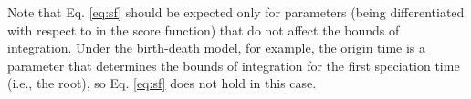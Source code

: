 \documentclass[oneside]{article}
\begin{document}
Note that Eq. \ref{eq:sf} should be expected only for parameters
(being differentiated with respect to in the score function) that
do not affect the bounds of integration.
Under the birth-death model, for example, the origin time is a parameter
that determines the bounds of integration for the first speciation
time (i.e., the root), so Eq. \ref{eq:sf} does not hold in this case.


\clearpage



\end{document}
